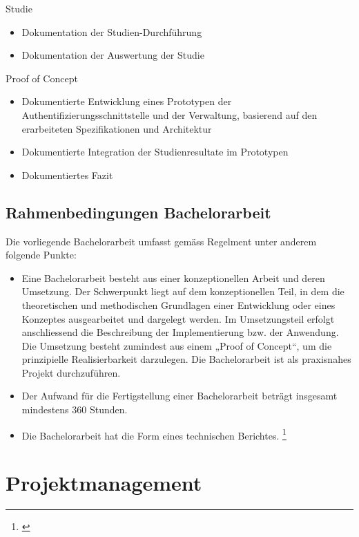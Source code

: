 Studie

\begin{itemize}
\tightlist
\item
  Dokumentation der Studien-Durchführung
\item
  Dokumentation der Auswertung der Studie
\end{itemize}

Proof of Concept

\begin{itemize}
\tightlist
\item
  Dokumentierte Entwicklung eines Prototypen der
  Authentifizierungsschnittstelle und der Verwaltung, basierend auf den
  erarbeiteten Spezifikationen und Architektur
\item
  Dokumentierte Integration der Studienresultate im Prototypen
\item
  Dokumentiertes Fazit
\end{itemize}

\hypertarget{rahmenbedingungen-bachelorarbeit}{\section{Rahmenbedingungen
Bachelorarbeit}\label{rahmenbedingungen-bachelorarbeit}}

Die vorliegende Bachelorarbeit umfasst gemäss Regelment unter anderem
folgende Punkte:

\begin{itemize}
\tightlist
\item
  Eine Bachelorarbeit besteht aus einer konzeptionellen Arbeit und deren
  Umsetzung. Der Schwerpunkt liegt auf dem konzeptionellen Teil, in dem
  die theoretischen und methodischen Grundlagen einer Entwicklung oder
  eines Konzeptes ausgearbeitet und dargelegt werden. Im Umsetzungsteil
  erfolgt anschliessend die Beschreibung der Implementierung bzw. der
  Anwendung. Die Umsetzung besteht zumindest aus einem „Proof of
  Concept``, um die prinzipielle Realisierbarkeit darzulegen. Die
  Bachelorarbeit ist als praxisnahes Projekt durchzuführen.
\item
  Der Aufwand für die Fertigstellung einer Bachelorarbeit beträgt
  insgesamt mindestens 360 Stunden.
\item
  Die Bachelorarbeit hat die Form eines technischen Berichtes.
  \footnote{\autocite{bachelorreglement}}
\end{itemize}

\newpage

\chapter{Projektmanagement}\label{projektmanagement}

